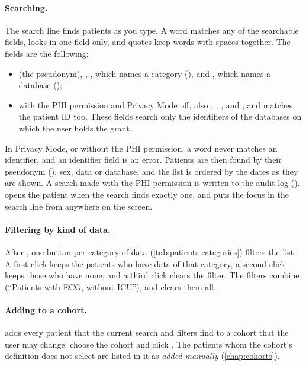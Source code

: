 \paragraph{Searching.} The search line finds patients as you type. A word matches any of the
searchable fields,  looks in one field only, and quotes keep words with
spaces together. The fields are the following:
\begin{itemize}
\item {} (the pseudonym), , , which names a category
  (), and , which names a database ();
\item with the PHI permission and Privacy Mode off, also , ,
  ,  and \phimark, and  matches the patient ID too.
  These fields search only the identifiers of the databases on which the user holds the
   grant.
\end{itemize}
In Privacy Mode, or without the PHI permission, a word never matches an identifier, and an
identifier field is an error. Patients are then found by their pseudonym (), sex,
data or database, and the list is ordered by the dates as they are shown. A search made with the
PHI permission is written to the audit log ().  opens the patient
when the search finds exactly one, and \key{/} puts the focus in the search line from anywhere on
the screen.

\paragraph{Filtering by kind of data.} After , one button per category of data
(\cref{tab:patients-categories}) filters the list. A first click keeps the patients who have
data of that category, a second click keeps those who have none, and a third click clears the
filter. The filters combine (``Patients with ECG, without ICU''), and  clears
them all.

\paragraph{Adding to a cohort.}  adds every patient that the current
search and filters find to a cohort that the user may change: choose the cohort and click
. The patients whom the cohort's definition does not select are listed
in it as \emph{added manually} (\cref{chap:cohorts}).


